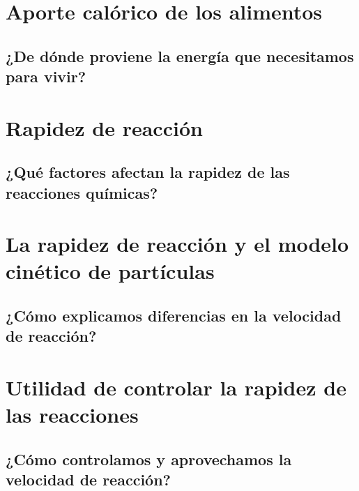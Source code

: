 \documentclass[11pt]{book}
\begin{document}
\newpage
\section{Aporte calórico de los alimentos}
\subsection{¿De dónde proviene la energía que necesitamos para vivir?}

\newpage
\section{Rapidez de reacción}
\subsection{¿Qué factores afectan la rapidez de las reacciones químicas?}

\newpage
\section{La rapidez de reacción y el modelo cinético de partículas}
\subsection{¿Cómo explicamos diferencias en la velocidad de reacción?}

\newpage
\section{Utilidad de controlar la rapidez de las reacciones}
\subsection{¿Cómo controlamos y aprovechamos la velocidad de reacción?}
\end{document}
